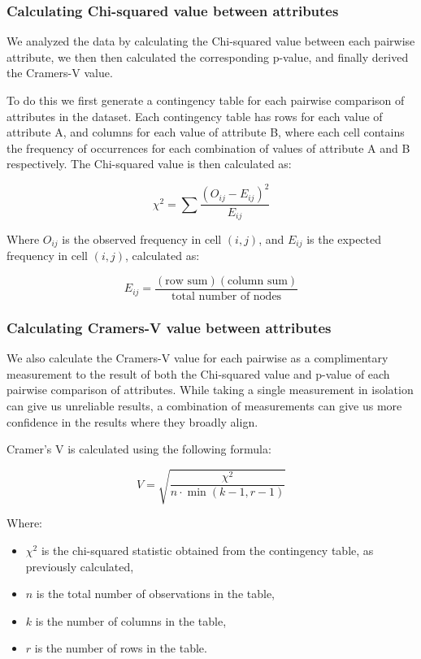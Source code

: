 \documentclass[conference]{IEEEtran}
\begin{document}
\subsubsection{Calculating Chi-squared value between attributes}

We analyzed the data by calculating the Chi-squared value between each pairwise attribute, we then then calculated the corresponding p-value, and finally derived the Cramers-V value.

To do this we first generate a contingency table for each pairwise comparison of attributes in the dataset.  Each contingency table has rows for each value of attribute A, and columns for each value of attribute B, where each cell contains the frequency of occurrences for each combination of values of attribute A and B respectively. The Chi-squared value is then calculated as:

\[
\chi^2 = \sum \frac{(O_{ij} - E_{ij})^2}{E_{ij}}
\]

Where $O_{ij}$ is the observed frequency in cell $(i, j)$, and $E_{ij}$ is the expected frequency in cell $(i, j)$, calculated as:

\[
E_{ij} = \frac{(\text{row sum})(\text{column sum})}{\text{total number of nodes}}
\]

\subsubsection{Calculating Cramers-V value between attributes}

We also calculate the Cramers-V value for each pairwise as a complimentary measurement to the result of both the Chi-squared value and p-value of each pairwise comparison of attributes.  While taking a single measurement in isolation can give us unreliable results, a combination of measurements can give us more confidence in the results where they broadly align.

Cramer's V is calculated using the following formula:

\[ V = \sqrt{\frac{\chi^2}{n \cdot \min(k-1, r-1)}} \]

Where:
\begin{itemize}
    \item $\chi^2$ is the chi-squared statistic obtained from the contingency table, as previously calculated,
    \item $n$ is the total number of observations in the table,
    \item $k$ is the number of columns in the table,
    \item $r$ is the number of rows in the table.
\end{itemize}
\end{document}
